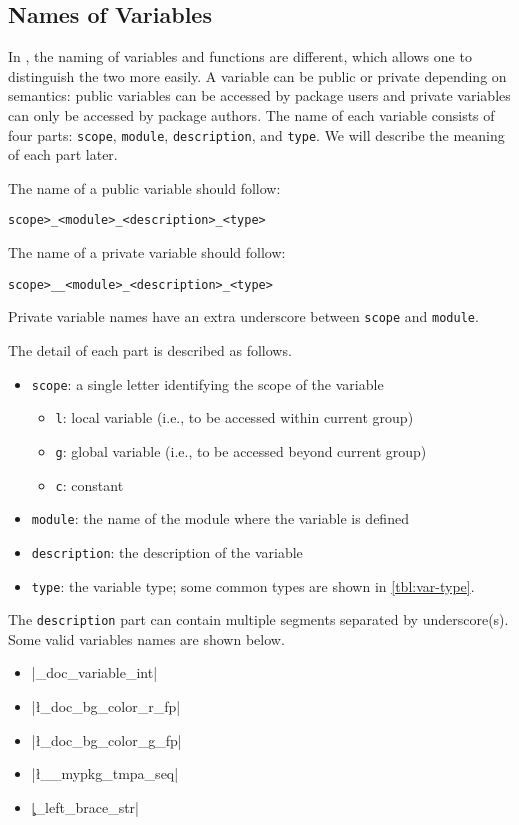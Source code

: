 \documentclass{ltugboat}
\begin{document}
\subsection{Names of Variables}\label{sec:name-of-variables}

In \LTT{}, the naming of variables and functions are different, which allows one to distinguish the two more easily. 
A \LTT{} variable can be public or private depending on semantics: public variables can be accessed by package users and private variables can only be accessed by package authors.
The name of each \LTT{} variable consists of four parts: \texttt{scope}, \texttt{module}, \texttt{description}, and \texttt{type}. 
We will describe the meaning of each part later.


\vspace*{0.5\baselineskip}
\par\noindent The name of a public variable should follow:
\begin{center}
\texttt{\string\<scope>\_<module>\_<description>\_<type>}
\end{center}
The name of a private variable should follow:
\begin{center}
\texttt{\string\<scope>\_\_<module>\_<description>\_<type>}
\end{center}
Private variable names have an extra underscore between \texttt{scope} and \texttt{module}.

\vspace*{0.5\baselineskip}
\par\noindent The detail of each part is described as follows.
\begin{itemize}
\item \texttt{scope}: a single letter identifying the scope of the variable
\begin{itemize}
\item \texttt{l}: local variable (i.e., to be accessed within current group)
\item \texttt{g}: global variable (i.e., to be accessed beyond current group)
\item \texttt{c}: constant
\end{itemize}
\item \texttt{module}: the name of the module where the variable is defined
\item \texttt{description}: the description of the variable
\item \texttt{type}: the variable type; some common types are shown in \cref{tbl:var-type}.
\end{itemize}
The \texttt{description} part can contain multiple segments separated by underscore(s). 
Some valid variables names are shown below.
\begin{itemize}
\item \inltex|\g_doc_variable_int|
\item \inltex|\l_doc_bg_color_r_fp|
\item \inltex|\l_doc_bg_color_g_fp|
\item \inltex|\l__mypkg_tmpa_seq|
\item \inltex|\c_left_brace_str|
\end{itemize}
\end{document}
